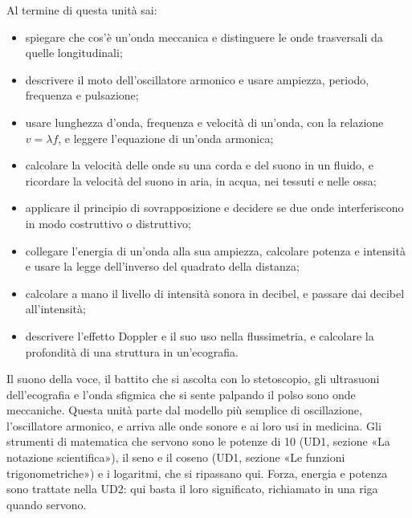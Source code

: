 \dispensa

\begin{tcolorbox}[fisbox={formula}{formulaBg},title={Obiettivi dell'unità}]
Al termine di questa unità sai:
\begin{itemize}
  \item spiegare che cos'è un'onda meccanica e distinguere le onde trasversali da quelle longitudinali;
  \item descrivere il moto dell'oscillatore armonico e usare ampiezza, periodo, frequenza e pulsazione;
  \item usare lunghezza d'onda, frequenza e velocità di un'onda, con la relazione $v = \lambda f$, e leggere l'equazione di un'onda armonica;
  \item calcolare la velocità delle onde su una corda e del suono in un fluido, e ricordare la velocità del suono in aria, in acqua, nei tessuti e nelle ossa;
  \item applicare il principio di sovrapposizione e decidere se due onde interferiscono in modo costruttivo o distruttivo;
  \item collegare l'energia di un'onda alla sua ampiezza, calcolare potenza e intensità e usare la legge dell'inverso del quadrato della distanza;
  \item calcolare a mano il livello di intensità sonora in decibel, e passare dai decibel all'intensità;
  \item descrivere l'effetto Doppler e il suo uso nella flussimetria, e calcolare la profondità di una struttura in un'ecografia.
\end{itemize}
\end{tcolorbox}

Il suono della voce, il battito che si ascolta con lo stetoscopio, gli ultrasuoni dell'ecografia e l'onda sfigmica che si sente palpando il polso sono onde meccaniche. Questa unità parte dal modello più semplice di oscillazione, l'oscillatore armonico, e arriva alle onde sonore e ai loro usi in medicina. Gli strumenti di matematica che servono sono le potenze di 10 (UD1, sezione «La notazione scientifica»), il seno e il coseno (UD1, sezione «Le funzioni trigonometriche») e i logaritmi, che si ripassano qui. Forza, energia e potenza sono trattate nella UD2: qui basta il loro significato, richiamato in una riga quando servono.

